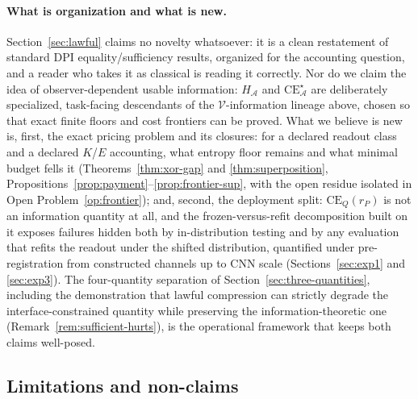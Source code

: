 \documentclass[twocolumn,10pt]{article}
\theoremstyle{definition}
\theoremstyle{remark}
\newcommand{\cA}{\mathcal{A}}
\newcommand{\CE}{\mathrm{CE}}
\newcommand{\CEQ}[1]{\CE_{Q}({#1})}
\newcommand{\rP}{r_{P}}
\begin{document}
\paragraph{What is organization and what is new.}
Section~\ref{sec:lawful} claims no novelty whatsoever: it is a clean
restatement of standard DPI equality/sufficiency results, organized
for the accounting question, and a reader who takes it as classical
is reading it correctly. Nor do we claim the idea of
observer-dependent usable information: $H_{\cA}$ and
$\CE^{\star}_{\cA}$ are deliberately specialized, task-facing
descendants of the $\mathcal{V}$-information lineage above, chosen so
that exact finite floors and cost frontiers can be proved. What we
believe is new is, first, the exact pricing problem and its closures:
for a declared readout class and a declared $K$/$E$ accounting,
what entropy floor remains and what minimal budget fells it
(Theorems~\ref{thm:xor-gap} and \ref{thm:superposition},
Propositions~\ref{prop:payment}--\ref{prop:frontier-sup}, with the
open residue isolated in Open Problem~\ref{op:frontier}); and,
second, the deployment split: $\CEQ{\rP}$ is not an information
quantity at all, and the frozen-versus-refit decomposition built on
it exposes failures hidden both by in-distribution testing and by any
evaluation that refits the readout under the shifted distribution,
quantified under pre-registration from constructed channels up to CNN
scale (Sections~\ref{sec:exp1} and \ref{sec:exp3}). The four-quantity
separation of Section~\ref{sec:three-quantities}, including the
demonstration that lawful compression can strictly degrade the
interface-constrained quantity while preserving the
information-theoretic one (Remark~\ref{rem:sufficient-hurts}), is the
operational framework that keeps both claims well-posed.

\subsection{Limitations and non-claims}
\label{sec:limitations}
\end{document}
